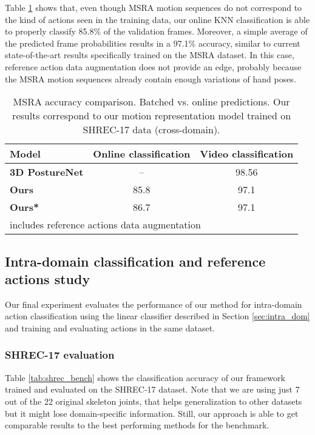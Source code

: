 \documentclass[letterpaper, 10 pt, conference]{ieeeconf}
\begin{document}
Table \ref{tab:msra_bench} shows that, even though MSRA motion sequences do not correspond to the kind of actions seen in the training data, our online KNN classification is able to properly classify 85.8\% of the validation frames. Moreover, a simple average of the predicted frame probabilities results in a 97.1\% accuracy, similar to current state-of-the-art results specifically trained on the MSRA dataset.
In this case, reference action data augmentation does not provide an edge, probably because the MSRA motion sequences already contain enough variations of hand poses.

\begin{table}[ht]
    \centering
\begin{tabular}{|l|c|c|}
\hline
\textbf{Model} & \textbf{Online classification} & \multicolumn{1}{l|}{\textbf{Video classification}} \\ \hline
\textbf{3D PostureNet \cite{liu20203d}} & -- & 98.56 \\ \hline
\textbf{Ours} & 85.8 & 97.1 \\ \hline
\textbf{Ours*} & 86.7 & 97.1 \\ \hline
\multicolumn{3}{l}{\footnotesize  includes reference actions data augmentation} \\
\end{tabular}
    \caption{MSRA accuracy comparison. Batched vs. online predictions. Our results correspond to our motion representation model trained on SHREC-17 data (cross-domain).}
    \label{tab:msra_bench}
\end{table}






\subsection{Intra-domain classification and reference actions study}
\label{sec:intra-dom-res}
Our final experiment evaluates the performance of our method for intra-domain action classification using the linear classifier described in Section \ref{sec:intra_dom} and training and evaluating actions in the same dataset. 

\subsubsection{SHREC-17 evaluation}

Table \ref{tab:shrec_bench} shows the classification accuracy of our framework trained and evaluated on the SHREC-17 dataset.
Note that we are using just 7 out of the 22 original skeleton joints, that helps generalization to other datasets but it might lose domain-specific information. Still, our approach is able to get comparable results to the best performing methods for the benchmark.
\end{document}
